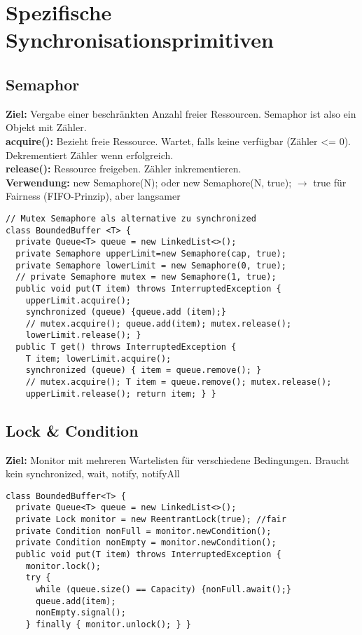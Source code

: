 
\section{Spezifische Synchronisationsprimitiven}
\subsection{Semaphor}
\textbf{Ziel:} Vergabe einer beschränkten Anzahl freier Ressourcen. Semaphor ist also ein Objekt mit Zähler.\\
\textcolor{b}{\textbf{acquire():}} Bezieht freie Ressource. Wartet, falls keine verfügbar (Zähler <= 0). Dekrementiert Zähler wenn erfolgreich.\\
\textcolor{b}{\textbf{release():}} Ressource freigeben. Zähler inkrementieren.\\
\textbf{Verwendung:} \textcolor{b}{new Semaphore(N);} oder \textcolor{b}{new Semaphore(N, true);} $\rightarrow$ true für Fairness (FIFO-Prinzip), aber langsamer
\begin{lstlisting}
// Mutex Semaphore als alternative zu synchronized
class BoundedBuffer <T> {
  private Queue<T> queue = new LinkedList<>();
  private Semaphore upperLimit=new Semaphore(cap, true);
  private Semaphore lowerLimit = new Semaphore(0, true);
  // private Semaphore mutex = new Semaphore(1, true);
  public void put(T item) throws InterruptedException {
    upperLimit.acquire();
    synchronized (queue) {queue.add (item);}
    // mutex.acquire(); queue.add(item); mutex.release();
    lowerLimit.release(); }
  public T get() throws InterruptedException {
    T item; lowerLimit.acquire();
    synchronized (queue) { item = queue.remove(); }
    // mutex.acquire(); T item = queue.remove(); mutex.release();
    upperLimit.release(); return item; } }
\end{lstlisting}
\subsection{Lock \& Condition}
\textcolor{b}{\textbf{Ziel:}} Monitor mit mehreren Wartelisten für verschiedene Bedingungen. Braucht kein \textcolor{b}{synchronized, wait, notify, notifyAll}
\begin{lstlisting}
class BoundedBuffer<T> {
  private Queue<T> queue = new LinkedList<>();
  private Lock monitor = new ReentrantLock(true); //fair
  private Condition nonFull = monitor.newCondition();
  private Condition nonEmpty = monitor.newCondition();
  public void put(T item) throws InterruptedException {
    monitor.lock();
    try {
      while (queue.size() == Capacity) {nonFull.await();}
      queue.add(item);
      nonEmpty.signal();
    } finally { monitor.unlock(); } }
\end{lstlisting}
